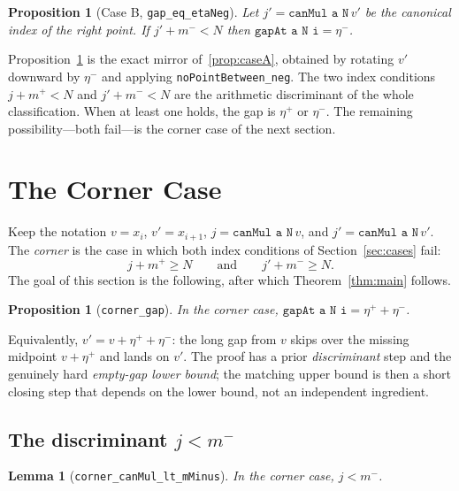 \documentclass[11pt,reqno]{amsart}
\theoremstyle{plain}
\newtheorem{lemma}[theorem]{Lemma}
\newtheorem{proposition}[theorem]{Proposition}
\theoremstyle{definition}
\theoremstyle{remark}
\newcommand{\etap}{\eta^{+}}
\newcommand{\etam}{\eta^{-}}
\newcommand{\mpl}{m^{+}}
\newcommand{\mmi}{m^{-}}
\newcommand{\code}[1]{\texttt{#1}}
\begin{document}
\begin{proposition}[Case B, \code{gap\_eq\_etaNeg}]\label{prop:caseB}
Let $j'=\code{canMul a N}\,v'$ be the canonical index of the \emph{right} point.
If $j'+\mmi<N$ then $\code{gapAt a N i}=\etam$.
\end{proposition}

Proposition~\ref{prop:caseB} is the exact mirror of~\ref{prop:caseA}, obtained
by rotating $v'$ downward by $\etam$ and applying \code{noPointBetween\_neg}.
The two index conditions $j+\mpl<N$ and $j'+\mmi<N$ are the arithmetic
discriminant of the whole classification.  When at least one holds, the gap is
$\etap$ or $\etam$.  The remaining possibility---both fail---is the corner case
of the next section.

\section{The Corner Case}\label{sec:corner}

Keep the notation $v=x_i$, $v'=x_{i+1}$, $j=\code{canMul a N}\,v$, and
$j'=\code{canMul a N}\,v'$.  The \emph{corner} is the case in which both index
conditions of Section~\ref{sec:cases} fail:
\[
  j+\mpl \ge N \qquad\text{and}\qquad j'+\mmi \ge N. \tag{corner}
\]
The goal of this section is the following, after which Theorem~\ref{thm:main}
follows.

\begin{proposition}[\code{corner\_gap}]\label{prop:corner}
In the corner case, $\code{gapAt a N i}=\etap+\etam$.
\end{proposition}

Equivalently, $v'=v+\etap+\etam$: the long gap from $v$ skips over the missing
midpoint $v+\etap$ and lands on $v'$.  The proof has a prior \emph{discriminant}
step and the genuinely hard \emph{empty-gap lower bound}; the matching upper
bound is then a short closing step that depends on the lower bound, not an
independent ingredient.

\subsection{The discriminant \texorpdfstring{$j<\mmi$}{j < m-}}

\begin{lemma}[\code{corner\_canMul\_lt\_mMinus}]\label{lem:hP1}
In the corner case, $j<\mmi$.
\end{lemma}
\end{document}
